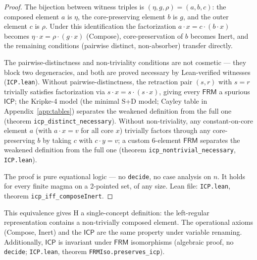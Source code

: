 \documentclass[sigconf,screen,review,anonymous]{acmart}
\newcommand{\dotop}{\cdot}
\newcommand{\FRM}{\textsf{FRM}}
\newcommand{\ICP}{\textsf{ICP}}
\begin{document}
\begin{proof}
The bijection between witness triples is $(\eta, g, \rho) = (a, b, c)$: the composed element $a$ is $\eta$, the core-preserving element $b$ is $g$, and the outer element $c$ is $\rho$. Under this identification the factorization $a \dotop x = c \dotop (b \dotop x)$ becomes $\eta \dotop x = \rho \dotop (g \dotop x)$ (Compose), core-preservation of $b$ becomes Inert, and the remaining conditions (pairwise distinct, non-absorber) transfer directly.

The pairwise-distinctness and non-triviality conditions are not cosmetic — they block two degeneracies, and both are proved necessary by Lean-verified witnesses (\texttt{ICP.lean}). Without pairwise-distinctness, the retraction pair $(s, r)$ with $s = r$ trivially satisfies factorization via $s \dotop x = s \dotop (s \dotop x)$, giving every $\FRM$ a spurious $\ICP$; the Kripke-4 model (the minimal S{+}D model; Cayley table in Appendix~\ref{app:tables}) separates the weakened definition from the full one (theorem \texttt{icp\_distinct\_necessary}). Without non-triviality, any constant-on-core element $a$ (with $a \dotop x = v$ for all core $x$) trivially factors through any core-preserving $b$ by taking $c$ with $c \dotop y = v$; a custom 6-element $\FRM$ separates the weakened definition from the full one (theorem \texttt{icp\_nontrivial\_necessary}, \texttt{ICP.lean}).

The proof is pure equational logic — no \texttt{decide}, no case analysis on $n$. It holds for every finite magma on a 2-pointed set, of any size. Lean file: \texttt{ICP.lean}, theorem \texttt{icp\_iff\_composeInert}.
\end{proof}

This equivalence gives H a single-concept definition: the left-regular representation contains a non-trivially composed element. The operational axioms (Compose, Inert) and the $\ICP$ are the same property under variable renaming. Additionally, $\ICP$ is invariant under $\FRM$ isomorphisms (algebraic proof, no \texttt{decide}; \texttt{ICP.lean}, theorem \texttt{FRMIso.preserves\_icp}).
\end{document}
